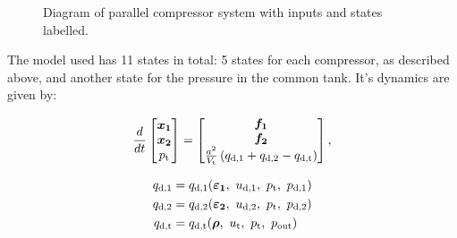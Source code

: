 \begin{figure}

  \caption{Diagram of parallel compressor system with inputs and states labelled.}
  \label{fig:mod:parallel}
\end{figure}



The model used has 11 states in total: 5 states for each compressor, as described above, and another state for the pressure in the common tank. It's dynamics are given by:

\begin{equation}
  \frac{d}{dt}\begin{bmatrix}
    \bm{x_1}\\
    \bm{x_2}\\
    p_\text{t}
  \end{bmatrix}
  =
  \begin{bmatrix}
    \bm{f_1}\\
    \bm{f_2}\\
    \frac{a^2}{V_\text{t}}\left(q_{\text{d,1}}+q_{\text{d,2}}-q_{\text{d,t}}\right)
  \end{bmatrix},
\end{equation}

\begin{equation}
  \begin{split}
    q_{\text{d,1}} & = q_{\text{d,1}}(\vc{\varepsilon_1},\ u_{\text{d},1},\ p_{\text{t}},\ p_{\text{d,1}})\\
    q_{\text{d,2}} & = q_{\text{d,2}}(\vc{\varepsilon_2},\ u_{\text{\text{d}},2},\ p_{\text{t}},\ p_{\text{d,2}})\\
    q_{\text{d,t}} & = q_{\text{d,t}}(\vc{\rho},\ u_{\text{t}},\ p_\text{t},\ p_{\text{out}})
  \end{split}
\end{equation}

